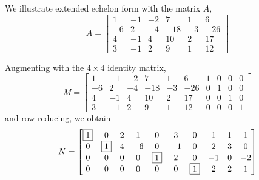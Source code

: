 \documentclass{ximera}
\begin{document}
\begin{example}

  We illustrate extended echelon form with the matrix $A$,
  \[
    A=
    \begin{bmatrix}
      1 & -1 & -2 & 7 & 1 & 6 \\
      -6 & 2 & -4 & -18 & -3 & -26 \\
      4 & -1 & 4 & 10 & 2 & 17 \\
      3 & -1 & 2 & 9 & 1 & 12
    \end{bmatrix}
  \]

  Augmenting with the $4\times 4$ identity matrix,
  \[
    M=
    \begin{bmatrix}
      1 & -1 & -2 & 7 & 1 & 6 & 1 & 0 & 0 & 0 \\
      -6 & 2 & -4 & -18 & -3 & -26 & 0 & 1 & 0 & 0 \\
      4 & -1 & 4 & 10 & 2 & 17 & 0 & 0 & 1 & 0 \\
      3 & -1 & 2 & 9 & 1 & 12 & 0 & 0 & 0 & 1
    \end{bmatrix}
  \]
  and row-reducing, we obtain
  \[
    N=
    \begin{bmatrix}
      \fbox{1} & 0 & 2 & 1 & 0 & 3 & 0 & 1 & 1 & 1\\
      0 & \fbox{1} & 4 & -6 & 0 & -1 & 0 & 2 & 3 & 0 \\
      0 & 0 & 0 & 0 & \fbox{1} & 2 & 0 & -1 & 0 & -2 \\
      0 & 0 & 0 & 0 & 0 & 0 & \fbox{1} & 2 & 2 & 1
    \end{bmatrix}
  \]
  

\end{example}
\end{document}
